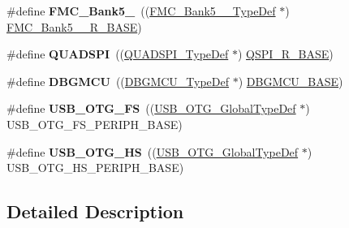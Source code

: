 \begin{DoxyCompactItemize}
\#define {\bfseries F\+M\+C\+\_\+\+Bank5\+\_}~((\mbox{\hyperlink{struct_f_m_c___bank5__6___type_def}{F\+M\+C\+\_\+\+Bank5\+\_\+\_\+\+Type\+Def}} $\ast$) \mbox{\hyperlink{group___peripheral__memory__map_gace117149a4fc0d07c38cc997fe4c4a73}{F\+M\+C\+\_\+\+Bank5\+\_\+\_\+\+R\+\_\+\+B\+A\+SE}})
\item 
\mbox{\label{group___peripheral__declaration_gac7fb6e7a090282458855473a93385f66}} 
\#define {\bfseries Q\+U\+A\+D\+S\+PI}~((\mbox{\hyperlink{struct_q_u_a_d_s_p_i___type_def}{Q\+U\+A\+D\+S\+P\+I\+\_\+\+Type\+Def}} $\ast$) \mbox{\hyperlink{group___peripheral__memory__map_ga3b6b7d9c67dec50557fd634505198e9d}{Q\+S\+P\+I\+\_\+\+R\+\_\+\+B\+A\+SE}})
\item 
\mbox{\label{group___peripheral__declaration_ga92ec6d9ec2251fda7d4ce09748cd74b4}} 
\#define {\bfseries D\+B\+G\+M\+CU}~((\mbox{\hyperlink{struct_d_b_g_m_c_u___type_def}{D\+B\+G\+M\+C\+U\+\_\+\+Type\+Def}} $\ast$) \mbox{\hyperlink{group___peripheral__memory__map_ga4adaf4fd82ccc3a538f1f27a70cdbbef}{D\+B\+G\+M\+C\+U\+\_\+\+B\+A\+SE}})
\item 
\mbox{\label{group___peripheral__declaration_ga9ebb053ee138fb47cdfede0e3371123d}} 
\#define {\bfseries U\+S\+B\+\_\+\+O\+T\+G\+\_\+\+FS}~((\mbox{\hyperlink{struct_u_s_b___o_t_g___global_type_def}{U\+S\+B\+\_\+\+O\+T\+G\+\_\+\+Global\+Type\+Def}} $\ast$) U\+S\+B\+\_\+\+O\+T\+G\+\_\+\+F\+S\+\_\+\+P\+E\+R\+I\+P\+H\+\_\+\+B\+A\+SE)
\item 
\mbox{\label{group___peripheral__declaration_ga820f5f7cb0a7af72a2444a1903fd83bc}} 
\#define {\bfseries U\+S\+B\+\_\+\+O\+T\+G\+\_\+\+HS}~((\mbox{\hyperlink{struct_u_s_b___o_t_g___global_type_def}{U\+S\+B\+\_\+\+O\+T\+G\+\_\+\+Global\+Type\+Def}} $\ast$) U\+S\+B\+\_\+\+O\+T\+G\+\_\+\+H\+S\+\_\+\+P\+E\+R\+I\+P\+H\+\_\+\+B\+A\+SE)
\end{DoxyCompactItemize}


\subsection{Detailed Description}
